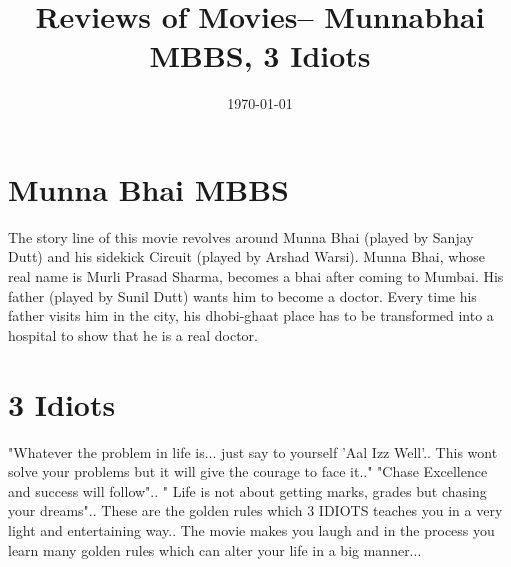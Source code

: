 \documentclass{article}
\title{Reviews of Movies-- Munnabhai MBBS, 3 Idiots}
\date{\today}
\begin{document}
\maketitle

\section{Munna Bhai MBBS}
The story line of this movie revolves around Munna Bhai (played by Sanjay Dutt) and his sidekick Circuit (played by Arshad Warsi). Munna Bhai, whose real name is Murli Prasad Sharma, becomes a bhai after coming to Mumbai. His father (played by Sunil Dutt) wants him to become a doctor. Every time his father visits him in the city, his dhobi-ghaat place has to be transformed into a hospital to show that he is a real doctor.




\section{3 Idiots}

"Whatever the problem in life is... just say to yourself 'Aal Izz Well'.. This wont solve your problems but it will give the courage to face it.." "Chase Excellence and success will follow".. " Life is not about getting marks, grades but chasing your dreams".. These are the golden rules which 3 IDIOTS teaches you in a very light and entertaining way.. The movie makes you laugh and in the process you learn many golden rules which can alter your life in a big manner...
\end{document}
